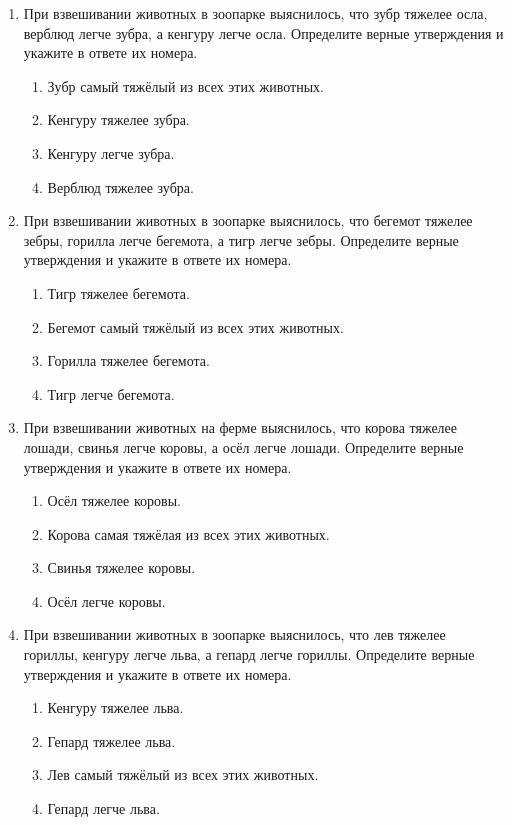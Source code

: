 \documentclass[a4paper,12pt]{article}
\newcommand{\taskspace}{\par\vspace{0.42cm}}
\begin{document}
\begin{enumerate}[resume]
\taskspace

\item При взвешивании животных в зоопарке выяснилось, что зубр тяжелее осла, верблюд легче зубра, а кенгуру легче осла. Определите верные утверждения и укажите в ответе их номера.
\begin{enumerate}[label=\arabic*),leftmargin=8mm,itemsep=0.25em,topsep=0.35em]
\item Зубр самый тяжёлый из всех этих животных.
\item Кенгуру тяжелее зубра.
\item Кенгуру легче зубра.
\item Верблюд тяжелее зубра.
\end{enumerate}

\taskspace

\item При взвешивании животных в зоопарке выяснилось, что бегемот тяжелее зебры, горилла легче бегемота, а тигр легче зебры. Определите верные утверждения и укажите в ответе их номера.
\begin{enumerate}[label=\arabic*),leftmargin=8mm,itemsep=0.25em,topsep=0.35em]
\item Тигр тяжелее бегемота.
\item Бегемот самый тяжёлый из всех этих животных.
\item Горилла тяжелее бегемота.
\item Тигр легче бегемота.
\end{enumerate}

\taskspace

\item При взвешивании животных на ферме выяснилось, что корова тяжелее лошади, свинья легче коровы, а осёл легче лошади. Определите верные утверждения и укажите в ответе их номера.
\begin{enumerate}[label=\arabic*),leftmargin=8mm,itemsep=0.25em,topsep=0.35em]
\item Осёл тяжелее коровы.
\item Корова самая тяжёлая из всех этих животных.
\item Свинья тяжелее коровы.
\item Осёл легче коровы.
\end{enumerate}

\taskspace

\item При взвешивании животных в зоопарке выяснилось, что лев тяжелее гориллы, кенгуру легче льва, а гепард легче гориллы. Определите верные утверждения и укажите в ответе их номера.
\begin{enumerate}[label=\arabic*),leftmargin=8mm,itemsep=0.25em,topsep=0.35em]
\item Кенгуру тяжелее льва.
\item Гепард тяжелее льва.
\item Лев самый тяжёлый из всех этих животных.
\item Гепард легче льва.
\end{enumerate}


\end{enumerate}
\end{document}
